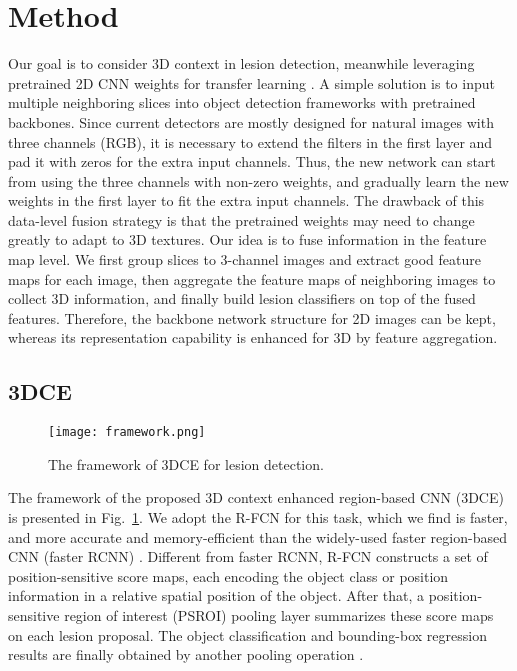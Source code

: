 \documentclass[a4paper]{llncs}
\def\Fig#1{{Fig.\ \ref{fig:#1}}}
\begin{document}
\section{Method}
\label{sec:method}


Our goal is to consider 3D context in lesion detection, meanwhile leveraging pretrained 2D CNN weights for transfer learning \cite{Shin2016CNN}. A simple solution \cite{Ding2017Lung3d} is to input multiple neighboring slices into object detection frameworks with pretrained backbones. Since current detectors are mostly designed for natural images with three channels (RGB), it is necessary to extend the filters in the first layer and pad it with zeros for the extra input channels. Thus, the new network can start from using the three channels with non-zero weights, and gradually learn the new weights in the first layer to fit the extra input channels. The drawback of this data-level fusion strategy is that the pretrained weights may need to change greatly to adapt to 3D textures. Our idea is to fuse information in the feature map level. We first group slices to 3-channel images and extract good feature maps for each image, then aggregate the feature maps of neighboring images to collect 3D information, and finally build lesion classifiers on top of the fused features. Therefore, the backbone network structure for 2D images can be kept, whereas its representation capability is enhanced for 3D by feature aggregation.

\subsection{3DCE}
\label{subsec:3dce}
\begin{figure}[]
	\begin{center}
\texttt{[image: framework.png]} \end{center}\caption{The framework of 3DCE for lesion detection.}\label{fig:framework}
\end{figure}

The framework of the proposed 3D context enhanced region-based CNN (3DCE) is presented in \Fig{framework}. We adopt the R-FCN \cite{Dai2016RFCN} for this task, which we find is faster, and more accurate and memory-efficient than the widely-used faster region-based CNN (faster RCNN) \cite{Ren2015Faster, Ding2017Lung3d}. Different from faster RCNN, R-FCN constructs a set of position-sensitive score maps, each encoding the object class or position information in a relative spatial position of the object. After that, a position-sensitive region of interest (PSROI) pooling layer summarizes these score maps on each lesion proposal. The object classification and bounding-box regression results are finally obtained by another pooling operation \cite{Dai2016RFCN}.
\end{document}
